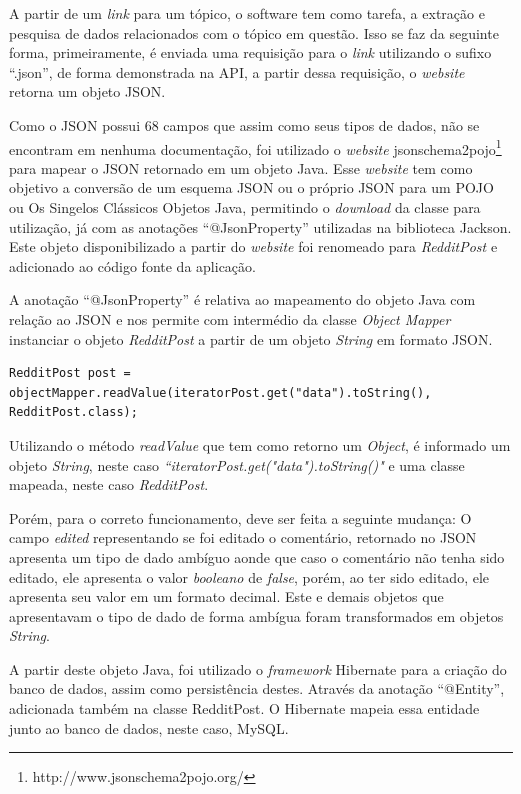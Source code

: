 A partir de um \textit{link} para um tópico, o software tem como tarefa, a
extração e pesquisa de dados relacionados com o tópico em questão. Isso se faz
da seguinte forma, primeiramente, é enviada uma requisição para o \textit{link}
utilizando o sufixo ``.json'', de forma demonstrada na API, a partir dessa
requisição, o \textit{website} retorna um objeto \ac{JSON}.

Como o \ac{JSON} possui 68 campos que assim como seus tipos de dados, não se
encontram em nenhuma documentação, foi utilizado o \textit{website}
jsonschema2pojo\footnote{http://www.jsonschema2pojo.org/} para mapear o \ac{JSON} retornado em um
objeto Java. Esse \textit{website} tem como objetivo a conversão de um esquema \ac{JSON} ou o próprio \ac{JSON} para um \ac{POJO} ou Os Singelos Clássicos Objetos Java, permitindo
o \textit{download} da classe para utilização, já com as anotações
``@JsonProperty'' utilizadas na biblioteca Jackson. Este objeto disponibilizado a
partir do \textit{website} foi renomeado para \textit{RedditPost} e adicionado
ao código fonte da aplicação.

A anotação ``@JsonProperty'' é relativa ao
mapeamento do objeto Java com relação ao \ac{JSON} e nos permite com
intermédio da classe \textit{Object Mapper} instanciar o objeto
\textit{RedditPost} a partir de um objeto \textit{String} em formato \ac{JSON}.

\begin{lstlisting}
RedditPost post = objectMapper.readValue(iteratorPost.get("data").toString(),
RedditPost.class);
\end{lstlisting}

Utilizando o método \textit{readValue} que tem como retorno um \textit{Object},
é informado um objeto \textit{String}, neste caso
\textit{``iteratorPost.get("data").toString()"} e uma classe mapeada, neste caso
\textit{RedditPost}.

Porém, para o correto funcionamento, deve ser feita a seguinte mudança: O campo
\textit{edited} representando se foi editado o comentário, retornado no
\ac{JSON} apresenta um tipo de dado ambíguo aonde que caso o comentário não tenha sido editado, ele apresenta o valor \textit{booleano} de \textit{false}, porém, ao ter sido editado, ele apresenta
seu valor em um formato decimal. Este e demais objetos que apresentavam o tipo
de dado de forma ambígua foram transformados em objetos \textit{String}.


A partir deste objeto Java, foi utilizado o \textit{framework} Hibernate para a
criação do banco de dados, assim como persistência destes. Através da anotação
``@Entity'', adicionada também na classe RedditPost. O Hibernate mapeia essa
entidade junto ao banco de dados, neste caso, MySQL.

